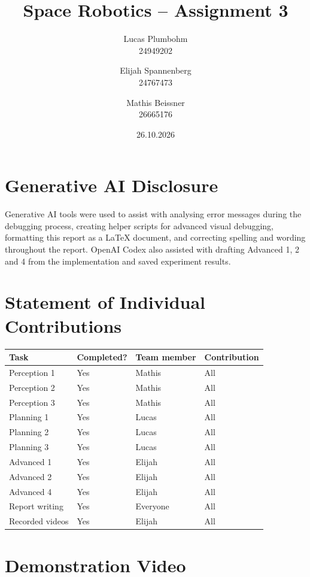 \documentclass[a4paper,11pt]{article}
\title{Space Robotics -- Assignment 3}
\author{Lucas Plumbohm \\ 24949202
    \and Elijah Spannenberg \\ 24767473
    \and Mathis Beissner \\ 26665176}
\date{26.10.2026}
\begin{document}
\setlength{\parindent}{0pt}

\maketitle

\section{Generative AI Disclosure}

Generative AI tools were used to assist with analysing error messages during
the debugging process, creating helper scripts for advanced visual debugging,
formatting this report as a \LaTeX{} document, and
correcting spelling and wording throughout the report. OpenAI Codex also assisted
with drafting Advanced 1, 2 and 4 from the implementation and saved experiment results.

\section{Statement of Individual Contributions}

\begin{table}[htbp]
    \centering
    \small
    \begin{tabularx}{\textwidth}{@{}l X X X@{}}
        \hline
        Task & Completed? & Team member & Contribution \\
        \hline
        Perception 1 & Yes & Mathis & All \\
        Perception 2 & Yes & Mathis & All \\
        Perception 3 & Yes & Mathis & All \\
        Planning 1 & Yes & Lucas & All \\
        Planning 2 & Yes & Lucas & All \\
        Planning 3 & Yes & Lucas & All \\
        Advanced 1 & Yes & Elijah & All \\
        Advanced 2 & Yes & Elijah & All \\
        Advanced 4 & Yes & Elijah & All \\
        Report writing & Yes & Everyone & All \\
        Recorded videos & Yes & Elijah & All \\
        \hline
    \end{tabularx}
\end{table}

\section{Demonstration Video}
\end{document}
